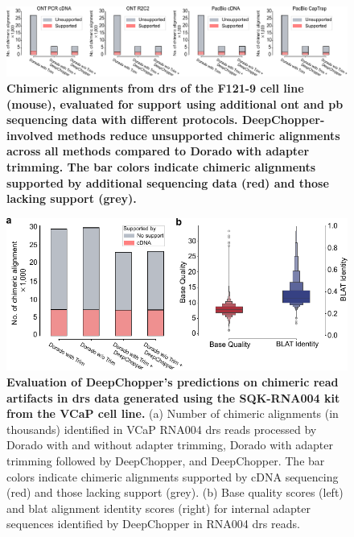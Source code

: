 \documentclass[pdflatex,sn-nature, lineno]{sn-jnl}%
\begin{document}
\begin{figure}[!ht]
	\includegraphics[height=0.2\columnwidth]{finals/sf2}
	\caption{ {\bf Chimeric alignments from \gls{drs} of the F121-9 cell line (mouse), evaluated for support using additional \gls{ont} and \gls{pb} sequencing data with different protocols. DeepChopper-involved methods reduce unsupported chimeric alignments across all methods compared to Dorado with adapter trimming. The bar colors indicate chimeric alignments supported by additional sequencing data (red) and those lacking support (grey).}}\label{fig:sf2}
\end{figure}

\begin{figure}[!ht]
	\includegraphics[height=0.41\columnwidth]{finals/sf3}
	\caption{ {\bf Evaluation of DeepChopper's predictions on chimeric read artifacts in \gls{drs} data generated using the SQK-RNA004 kit from the VCaP cell line.} (a) Number of chimeric alignments (in thousands) identified in VCaP RNA004 \gls{drs} reads processed by Dorado with and without adapter trimming, Dorado with adapter trimming followed by DeepChopper, and DeepChopper. The bar colors indicate chimeric alignments supported by cDNA sequencing (red) and those lacking support (grey). (b) Base quality scores (left) and \gls{blat} alignment identity scores (right) for internal adapter sequences identified by DeepChopper in RNA004 \gls{drs} reads.}\label{fig:sf3}
\end{figure}
\end{document}
